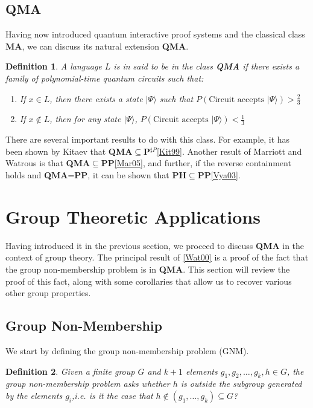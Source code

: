 \documentclass[12pt]{article}
\newtheorem*{defn}{Definition}
\newcommand{\ket}[1]{\vert #1 \rangle}
\begin{document}
	\subsection{QMA}
	Having now introduced quantum interactive proof systems and the classical class \textbf{MA}, we can discuss its natural extension \textbf{QMA}.
	\begin{defn}
		A language $L$ is in said to be in the class \textbf{QMA} if there exists a family of polynomial-time quantum circuits such that:
		\begin{enumerate}
			\item If $x\in L$, then there exists a state $\ket{\Psi}$ such that $P(\text{Circuit accepts } \ket{\Psi})>\frac{2}{3}$
			\item If $x\notin L$, then for any state $\ket{\Psi}$, $P(\text{Circuit accepts } \ket{\Psi})<\frac{1}{3}$
		\end{enumerate}
	\end{defn}
	 There are several important results to do with this class. For example, it has been shown by Kitaev that \textbf{QMA}$\subseteq$\textbf{P$^{\sharp P}$}\hyperref[kit99]{[Kit99]}. Another result of Marriott and Watrous is that \textbf{QMA}$\subseteq$\textbf{PP}\hyperref[mar05]{[Mar05]}, and further, if the reverse containment holds and \textbf{QMA}=\textbf{PP}, it can be shown that \textbf{PH}$\subseteq$\textbf{PP}\hyperref[vya03]{[Vya03]}.
    \section{Group Theoretic Applications}
    Having introduced it in the previous section, we proceed to discuss \textbf{QMA} in the context of group theory. The principal result of \hyperref[wat00]{[Wat00]} is a proof of the fact that the group non-membership problem is in \textbf{QMA}. This section will review the proof of this fact, along with some corollaries that allow us to recover various other group properties. 
    \subsection{Group Non-Membership}
    We start by defining the group non-membership problem (GNM).
    \begin{defn}
    	Given a finite group $G$ and $k+1$ elements $g_1,g_2,\dots,g_k,h\in G$, the group non-membership problem asks whether $h$ is outside the subgroup generated by the elements $g_i$,i.e. is it the case that $h\notin (g_1,\dots,g_k)\subseteq G$?
    \end{defn}
\end{document}
